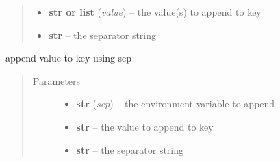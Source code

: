 \documentclass[a4paper,10pt,english]{sphinxmanual}
\begin{document}
\begin{fulllineitems}
\begin{fulllineitems}
\begin{quote}
\begin{description}
\begin{itemize}
\item {} 
\textbf{str or list} (\emph{value}) -- the value(s) to append to key

\item {} 
\textbf{str} -- the separator string

\end{itemize}

\end{description}\end{quote}

\end{fulllineitems}


\begin{fulllineitems}
\label{commands/apidoc/src:src.fileEnviron.LauncherFileEnviron.append_value}
append value to key using sep
\begin{quote}\begin{description}
\item[{Parameters}] \leavevmode\begin{itemize}
\item {} 
\textbf{str} (\emph{sep}) -- the environment variable to append

\item {} 
\textbf{str} -- the value to append to key

\item {} 
\textbf{str} -- the separator string

\end{itemize}

\end{description}\end{quote}

\end{fulllineitems}


\begin{fulllineitems}
\label{commands/apidoc/src:src.fileEnviron.LauncherFileEnviron.change_to_launcher}
\end{fulllineitems}



\end{fulllineitems}
\end{document}
